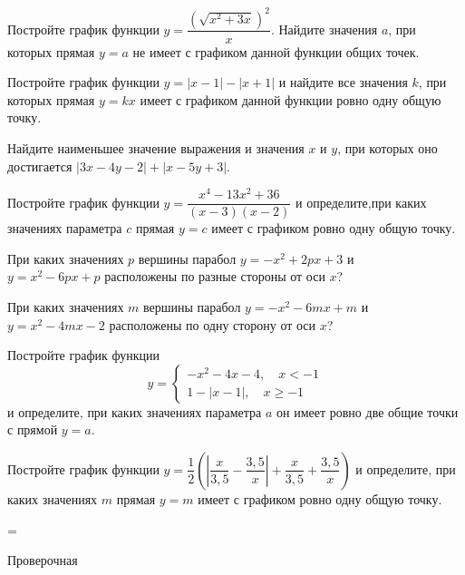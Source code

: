 \begin{homework}[number=3]
	\begin{listofex}
		\item Постройте график функции \( y=\dfrac{(\sqrt{x^2+3x})^2}{x} \).  Найдите значения \( a \), при которых прямая \( y=a \) не имеет с графиком данной функции общих точек.
		\item Постройте график функции \( y=|x-1|-|x+1| \) и найдите все значения \( k \), при которых прямая \( y=kx \) имеет с графиком данной функции ровно одну общую точку.
		\item Найдите наименьшее значение выражения и значения \( x \) и \( y \), при которых оно достигается \( |3x-4y-2|+|x-5y+3| \).
	\end{listofex}
\end{homework}

\begin{class}[number=7]
	\begin{listofex}
		\item Постройте график функции \(y=\dfrac{ x^4-13x^2+36 }{ (x-3)(x-2) }\) и определите,при каких значениях параметра \(c\) прямая \(y=c\) имеет с графиком ровно одну общую точку.
		\item При каких значениях \(p\) вершины парабол \(y=-x^2+2px+3\) и \\ \(y=x^2-6px+p\) расположены по разные стороны от оси \(x\)?
		\item При каких значениях \(m\) вершины парабол \(y=-x^2-6mx+m\) и \\ \(y=x^2-4mx-2\) расположены по одну сторону от оси \(x\)?
		\item Постройте график функции \[ y= \begin{cases} -x^2-4x-4, \quad x<-1 \\ 1-|x-1|, \quad x\ge-1 \end{cases} \] и определите, при каких значениях параметра \(a\) он имеет ровно две общие точки с прямой \(y=a\).
		\item Постройте график функции \( y=\dfrac{ 1 }{ 2 }\left( \left| \dfrac{ x }{ 3,5 }-\dfrac{ 3,5 }{ x } \right| +\dfrac{ x }{ 3,5 } + \dfrac{ 3,5 }{ x } \right) \) и определите, при каких значениях \(m\) прямая \(y=m\) имеет с графиком ровно одну общую точку.
	\end{listofex}
\end{class}

=%
\begin{exam}
	\begin{listofex}
		\item Проверочная
	\end{listofex}
\end{exam}
